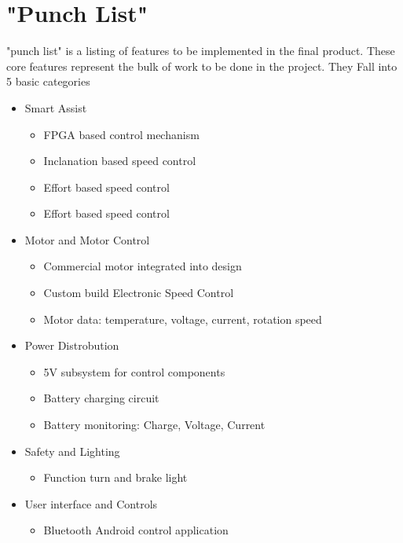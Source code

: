 \documentclass[12pt,article]{IEEEtran}
\begin{document}
\section{"Punch List"}
     "punch list" is a listing of features to be implemented in the final
    product. These core features represent the bulk of work to be done in the project. They Fall
    into 5 basic categories
    \begin{itemize}
        \item Smart Assist
            \begin{itemize}
                \item FPGA based control mechanism
                \item Inclanation based speed control
                \item Effort based speed control
                \item Effort based speed control
            \end{itemize}
        \item Motor and Motor Control 
            \begin{itemize}
                \item Commercial motor integrated into design
                \item Custom build Electronic Speed Control
                \item Motor data: temperature, voltage, current, rotation speed
            \end{itemize}
        \item Power Distrobution 
            \begin{itemize}
                \item 5V subsystem for control components
                \item Battery charging circuit
                \item Battery monitoring: Charge, Voltage, Current
            \end{itemize}
        \item Safety and Lighting
            \begin{itemize}
                \item Function turn and brake light
            \end{itemize}
        \item User interface and Controls
            \begin{itemize}
                \item Bluetooth Android control application
            \end{itemize}
        \end{itemize}
\end{document}
